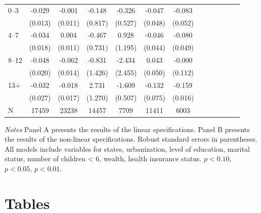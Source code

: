 \documentclass[12pt,english]{article}
\begin{document}
\begin{table}[!ht]
\begin{center}
\begin{adjustbox}{max width=.9\linewidth}
\begin{threeparttable}
{\begin{tabular}{l*{6}{S S}}
						0--3&   -0.029\sym{**} &   -0.001         &   -0.148         &   -0.326         &   -0.047         &   -0.083         \\
						&  (0.013)         &  (0.011)         &  (0.817)         &  (0.527)         &  (0.048)         &  (0.052)         \\
						4--7&   -0.034\sym{*}  &    0.004         &   -0.467         &    0.928         &   -0.046         &   -0.080\sym{*}  \\
						&  (0.018)         &  (0.011)         &  (0.731)         &  (1.195)         &  (0.044)         &  (0.049)         \\
						8--12&   -0.048\sym{**} &   -0.062\sym{***}&   -0.831         &   -2.434         &    0.043         &   -0.000         \\
						&  (0.020)         &  (0.014)         &  (1.426)         &  (2.455)         &  (0.050)         &  (0.112)         \\
						13+& -0.032         &   -0.018         &    2.731\sym{**} &   -1.609\sym{***}&   -0.132\sym{*}  &   -0.159\sym{***}\\
						&  (0.027)         &  (0.017)         &  (1.270)         &  (0.507)         &  (0.075)         &  (0.016)         \\
						\midrule
						N               &    17459         &    23238         &    14457         &     7709         &    11411         &     6003         \\
						\bottomrule
					\end{tabular}
					\begin{tablenotes}
						\item \footnotesize \textit{Notes} Panel A presents the results of the linear specifications. Panel B presents the results of the non-linear specifications. Robust standard errors in parentheses. All models include variables for  states, urbanization, level of education, marital status, number of children < 6, wealth, health insurance status. \sym{*} \(p<0.10\), \sym{**} \(p<0.05\), \sym{***} \(p<0.01\).
					\end{tablenotes}
				}
			\end{threeparttable}
		\end{adjustbox}
	\end{center}
\end{table}
\clearpage

\setcounter{table}{0} 
\setcounter{page}{1}
\nolinenumbers
\renewcommand{\thetable}{\arabic{table}}

\section*{Tables}
\end{document}

